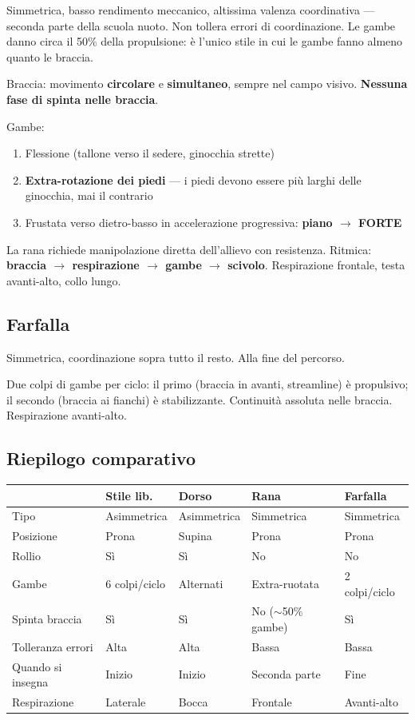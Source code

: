 \documentclass[12pt, a4paper]{article}
\begin{document}
Simmetrica, basso rendimento meccanico, altissima valenza coordinativa --- seconda parte della scuola nuoto. Non tollera errori di coordinazione. Le gambe danno circa il 50\% della propulsione: è l'unico stile in cui le gambe fanno almeno quanto le braccia.

Braccia: movimento \textbf{circolare} e \textbf{simultaneo}, sempre nel campo visivo. \textbf{Nessuna fase di spinta nelle braccia}.

Gambe:
\begin{enumerate}
  \item Flessione (tallone verso il sedere, ginocchia strette)
  \item \textbf{Extra-rotazione dei piedi} --- i piedi devono essere più larghi delle ginocchia, mai il contrario
  \item Frustata verso dietro-basso in accelerazione progressiva: \textbf{piano $\rightarrow$ FORTE}
\end{enumerate}

La rana richiede manipolazione diretta dell'allievo con resistenza. Ritmica: \textbf{braccia $\rightarrow$ respirazione $\rightarrow$ gambe $\rightarrow$ scivolo}. Respirazione frontale, testa avanti-alto, collo lungo.

\subsection{Farfalla}

Simmetrica, coordinazione sopra tutto il resto. Alla fine del percorso.

Due colpi di gambe per ciclo: il primo (braccia in avanti, streamline) è propulsivo; il secondo (braccia ai fianchi) è stabilizzante. Continuità assoluta nelle braccia. Respirazione avanti-alto.

\subsection{Riepilogo comparativo}

\begin{tabularx}{\textwidth}{lXXXX}
\toprule
\rowcolor{light} & \textbf{Stile lib.} & \textbf{Dorso} & \textbf{Rana} & \textbf{Farfalla} \\
\midrule
Tipo & Asimmetrica & Asimmetrica & Simmetrica & Simmetrica \\
Posizione & Prona & Supina & Prona & Prona \\
Rollio & Sì & Sì & No & No \\
Gambe & 6 colpi/ciclo & Alternati & Extra-ruotata & 2 colpi/ciclo \\
Spinta braccia & Sì & Sì & No ($\sim$50\% gambe) & Sì \\
Tolleranza errori & Alta & Alta & Bassa & Bassa \\
Quando si insegna & Inizio & Inizio & Seconda parte & Fine \\
Respirazione & Laterale & Bocca & Frontale & Avanti-alto \\
\bottomrule
\end{tabularx}
\end{document}
